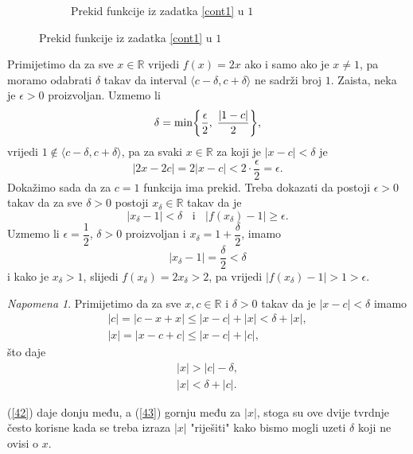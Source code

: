 \documentclass{book}
\let\originalleft\left
\let\originalright\right
\renewcommand{\left}{\mathopen{}\mathclose\bgroup\originalleft}
\renewcommand{\right}{\aftergroup\egroup\originalright}
\renewenvironment{proof}{%
    \vspace{-\parskip}\begin{oldproof}%
    }{%
    \end{oldproof}%
}
\theoremstyle{definition}
\theoremstyle{definition}
\theoremstyle{remark}
\newtheorem{remark}{Napomena}
\begin{document}
\begin{proof}[Rješenje]
\begin{figure}[ht]
\begin{subfigure}[t]{.5\textwidth}
\caption{Prekid funkcije iz zadatka \ref{cont1} u $1$}
\end{subfigure}
\end{figure}

Primijetimo da za sve $x\in \mathbb{R}$ vrijedi $f(x)=2x$ ako i samo ako je $x\neq 1$, pa moramo odabrati $\delta$ takav da interval $\langle c-\delta, c+\delta\rangle$ ne sadrži broj $1$. Zaista, neka je $\epsilon>0$ proizvoljan. Uzmemo li $$\delta=\min\left \{\dfrac{\epsilon}{2},\; \dfrac{|1-c|}{2}\right\},$$
vrijedi $1\notin \langle c-\delta, c+\delta\rangle$, pa za svaki $x\in \mathbb{R}$ za koji je $|x-c|<\delta$ je $$|2x-2c|=2|x-c|<2\cdot \dfrac{\epsilon}{2}=\epsilon.$$ 
Dokažimo sada da za $c=1$ funkcija ima prekid. Treba dokazati da postoji $\epsilon>0$ takav da za sve $\delta>0$ postoji $x_\delta\in \mathbb{R}$ takav da je 
$$|x_\delta-1|<\delta\;\;\text{ i }\;\;|f(x_\delta)-1|\geq \epsilon.$$ 
Uzmemo li $\epsilon=\dfrac{1}{2}$, $\delta>0$ proizvoljan i $x_\delta=1+\dfrac{\delta}{2}$, imamo 
$$|x_\delta-1|=\dfrac{\delta}{2}<\delta$$ 
i kako je $x_\delta> 1$, slijedi $f(x_\delta)=2x_\delta>2$, pa vrijedi $|f(x_\delta)-1|>1> \epsilon$.
\end{proof}
\begin{remark}
Primijetimo da za sve $x, c\in \mathbb{R}$ i $\delta>0$ takav da je $|x-c|<\delta$ imamo
\begin{gather*}
|c|=|c-x+x|\leq |x-c|+|x|<\delta+|x|,\\
|x|=|x-c+c|\leq |x-c|+|c|,
\end{gather*}
što daje
\begin{gather}
\label{42}
|x|>|c|-\delta,\\
\label{43}
|x|<\delta+|c|.
\end{gather}

\noindent (\ref{42}) daje donju među, a (\ref{43}) gornju među za $|x|$, stoga su ove dvije tvrdnje često korisne kada se treba izraza $|x|$ "riješiti" kako bismo mogli uzeti $\delta$ koji ne ovisi o $x$.
\end{remark}
\end{document}
